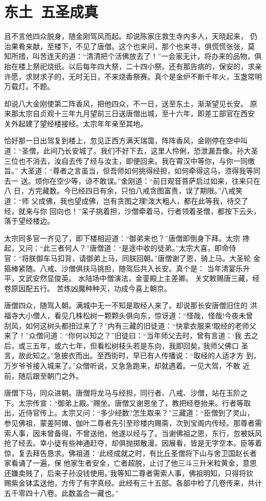 \chapter{东土~五圣成真}

且不言他四众脱身，随金刚驾风而起。却说陈家庄救生寺内多人，天晓起来，
仍治果肴来献，至楼下，不见了唐僧。这个也来问，那个也来寻，俱慌慌张张，莫
知所措，叫苦连天的道：“清清把个活佛放去了！”一会家无计，将办来的品物，俱
抬在楼上祭祀烧纸。以后每年四大祭，二十四小祭。还有那告病的，保安的，求亲
许愿，求财求子的，无时无日，不来烧香祭赛。真个是金炉不断千年火，玉盏常明
万载灯。不题。

却说八大金刚使第二阵香风，把他四众，不一日，送至东土，渐渐望见长安。
原来那太宗自贞观十三年九月望前三日送唐僧出城，至十六年，即差工部官在西安
关外起建了望经楼接经。太宗年年亲至其地。

恰好那一日出驾复到楼上，忽见正西方满天瑞霭，阵阵香风，金刚停在空中叫
道：“圣僧，此间乃长安城了。我们不好下去，这里人伶俐，恐泄漏吾像。孙大圣
三位也不消去，汝自去传了经与汝主，即便回来。我在霄汉中等你，与你一同缴旨。”
大圣道：“尊者之言虽当，但吾师如何挑得经担，如何牵得这马，须得我等同去一
送。烦你在空少等，谅不敢误。”金刚道：“前日观音菩萨启过如来，往来只在八
日，方完藏数。今已经四日有余，只怕八戒贪图富贵，误了期限。”八戒笑道：“师
父成佛，我也望成佛，岂有贪图之理!泼大粗人，都在此等我，待交了经，就来与你
回向也！”呆子挑着担，沙僧牵着马，行者领着圣僧，都按下云头，落于望经楼边。

太宗同多官一齐见了，即下楼相迎道：“御弟来也？”唐僧即倒身下拜。太宗
搀起，又问：“此三者何人？”唐僧道：“是途中收的徒弟。”太宗大喜，即命侍
官：“将朕御车马扣背，请御弟上马，同朕回朝。”唐僧谢了恩，骑上马。大圣轮
金箍棒紧随。八戒、沙僧俱扶马挑担，随驾后共入长安。真个是：
当年清宴乐升平，文武安然显俊英。
水陆场中僧演法，金銮殿上主差卿。
关文敕赐唐三藏，经卷原因配五行。
苦炼凶魔种种灭，功成今喜上朝京。

唐僧四众，随驾入朝。满城中无一不知是取经人来了。却说那长安唐僧旧住的
洪福寺大小僧人，看见几株松树一颗颗头俱向东，惊讶道：“怪哉，怪哉!今夜未曾
刮风，如何这树头都扭过来了？”内有三藏的旧徒道：“快拿衣服来!取经的老师父
来了！”众僧问道：“你何以知之？”旧徒曰：“当年师父去时，曾有言道：‘我
去之后，或三五年，或六七年，但看松树枝头若是东向，我即回矣。’我师父佛口
圣言，故此知之。”急披衣而出。至西街时，早已有人传播说：“取经的人适才方
到，万岁爷爷接入城来了。”众僧听说，又急急跑来，却就遇着。一见大驾，不敢
近前，随后跟至朝门之外。

唐僧下马，同众进朝。唐僧将龙马与经担，同行者、八戒、沙僧，站在玉阶之
下。太宗传宣：“御弟上殿。”赐坐。唐僧又谢恩坐了，教把经卷抬来。行者等取
出，近侍官传上。太宗又问：“多少经数?怎生取来？”三藏道：“臣僧到了灵山，
参见佛祖，蒙差阿傩、伽叶二尊者先引至珍楼内赐斋，次到宝阁内传经。那尊者需
索人事，因未曾备得，不曾送他，他遂以经与了。当谢佛祖之恩，东行，忽被妖风
抢了经去。幸小徒有些神通赶夺，却俱抛掷散漫。因展看，皆是无字空本。臣等着
惊，复去拜告恳求。佛祖道：‘此经成就之时，有比丘圣僧将下山与舍卫国赵长者
家看诵了一遍，保他家生者安全，亡者超脱，止讨了他三斗三升米粒黄金，意思
还嫌卖贱了，后来子孙没钱使用。’我等知二尊者需索人事，佛祖明知，只得将钦
赐紫金钵盂送他，方传了有字真经。此经有三十五部。各部中检了几卷传来，共计
五千零四十八卷。此数盖合一藏也。”

